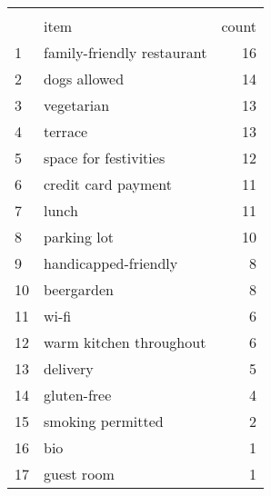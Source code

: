 \begin{tabular}{llr}
\\[-1.8ex]\hline
\hline \\[-1.8ex]
{} &                       item &  count \\
\midrule
1  & family-friendly restaurant &     16 \\
2  &               dogs allowed &     14 \\
3  &                 vegetarian &     13 \\
4  &                    terrace &     13 \\
5  &      space for festivities &     12 \\
6  &        credit card payment &     11 \\
7  &                      lunch &     11 \\
8  &                parking lot &     10 \\
9  &       handicapped-friendly &      8 \\
10 &                 beergarden &      8 \\
11 &                      wi-fi &      6 \\
12 &    warm kitchen throughout &      6 \\
13 &                   delivery &      5 \\
14 &                gluten-free &      4 \\
15 &          smoking permitted &      2 \\
16 &                        bio &      1 \\
17 &                 guest room &      1 \\
\bottomrule
\end{tabular}

